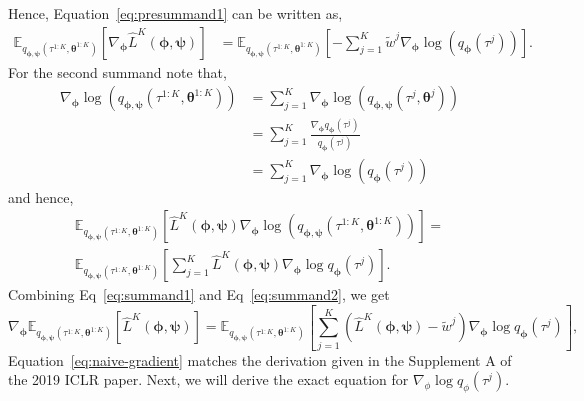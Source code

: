 \documentclass{article}
\newcommand{\bParam}{\bm{\theta}}
\newcommand{\E}{\mathbb{E}}
\begin{document}
Hence, Equation~\ref{eq:presummand1} can be written as,
\begin{align}\label{eq:summand1}
    \E_{q_{\bm{\phi}, \bm{\psi}}(\tau^{1:K}, \bParam^{1:K})}[\nabla_{\bm{\phi}} \hat{L}^K(\bm{\phi}, \bm{\psi})] &= \E_{q_{\bm{\phi}, \bm{\psi}}(\tau^{1:K}, \bParam^{1:K})}\left[- \sum_{j=1}^{K} \tilde{w}^j \nabla_{\bm{\phi}} \log(q_{\bm{\phi}}(\tau^j))\right].
\end{align}
For the second summand note that,
\begin{align*}
    \nabla_{\bm{\phi}} \log(q_{\bm{\phi}, \bm{\psi}}(\tau^{1:K}, \bParam^{1:K})) &= \sum\limits_{j=1}^{K} \nabla_{\bm{\phi}} \log(q_{\bm{\phi},\bm{\psi}}(\tau^{j}, \bParam^{j})) \\
    &= \sum\limits_{j=1}^{K} \frac{\nabla_{\bm{\phi}} q_{\bm{\phi}}(\tau^{j})}{q_{\bm{\phi}}(\tau^{j})} \\
    &= \sum\limits_{j=1}^{K} \nabla_{\bm{\phi}} \log(q_{\bm{\phi}}(\tau^{j}))
\end{align*}
and hence,
\begin{multline}\label{eq:summand2}
    \E_{q_{\bm{\phi}, \bm{\psi}}(\tau^{1:K}, \bParam^{1:K})}[\hat{L}^K(\bm{\phi}, \bm{\psi}) \nabla_{\bm{\phi}} \log(q_{\bm{\phi}, \bm{\psi}}(\tau^{1:K}, \bParam^{1:K}))] = \\
    \E_{q_{\bm{\phi}, \bm{\psi}}(\tau^{1:K},\bParam^{1:K})}\left[\sum\limits_{j=1}^{K} \hat{L}^K(\bm{\phi}, \bm{\psi}) \nabla_{\bm{\phi}} \log q_{\bm{\phi}}(\tau^{j})\right].
\end{multline}
Combining Eq~\ref{eq:summand1} and Eq~\ref{eq:summand2}, we get
\begin{equation}\label{eq:naive-gradient}
    \nabla_{\bm{\phi}} \E_{q_{\bm{\phi}, \bm{\psi}}(\tau^{1:K},\bParam^{1:K})}[\hat{L}^K(\bm{\phi}, \bm{\psi})] = \E_{q_{\bm{\phi}, \bm{\psi}}(\tau^{1:K},\bParam^{1:K})}\left[\sum\limits_{j=1}^{K} (\hat{L}^K(\bm{\phi}, \bm{\psi}) - \tilde{w}^j) \nabla_{\bm{\phi}} \log q_{\bm{\phi}}(\tau^j) \right],
\end{equation}
Equation~\ref{eq:naive-gradient} matches the derivation given in the Supplement A of the 2019 ICLR paper.
Next, we will derive the exact equation for $\nabla_{\phi} \log q_{\phi}(\tau^j)$.
\end{document}
